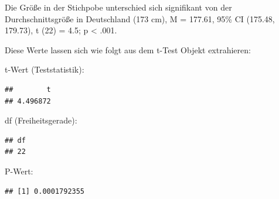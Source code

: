 \documentclass[
]{book}
\newenvironment{Shaded}{\begin{snugshade}}{\end{snugshade}}
\newcommand{\AttributeTok}[1]{\textcolor[rgb]{0.13,0.29,0.53}{#1}}
\newcommand{\DecValTok}[1]{\textcolor[rgb]{0.00,0.00,0.81}{#1}}
\newcommand{\FloatTok}[1]{\textcolor[rgb]{0.00,0.00,0.81}{#1}}
\newcommand{\FunctionTok}[1]{\textcolor[rgb]{0.13,0.29,0.53}{\textbf{#1}}}
\newcommand{\NormalTok}[1]{#1}
\newcommand{\SpecialCharTok}[1]{\textcolor[rgb]{0.81,0.36,0.00}{\textbf{#1}}}
\newcommand{\StringTok}[1]{\textcolor[rgb]{0.31,0.60,0.02}{#1}}
\begin{document}
Die Größe in der Stichpobe unterschied sich signifikant von der Durchschnittsgröße in Deutschland (173 cm), M = 177.61, 95\% CI (175.48, 179.73), t (22) = 4.5; p \textless{} .001.

Diese Werte lassen sich wie folgt aus dem t-Test Objekt extrahieren:

t-Wert (Teststatistik):

\begin{Shaded}
\end{Shaded}

\begin{verbatim}
##        t 
## 4.496872
\end{verbatim}

df (Freiheitsgerade):

\begin{Shaded}
\end{Shaded}

\begin{verbatim}
## df 
## 22
\end{verbatim}

P-Wert:

\begin{Shaded}
\end{Shaded}

\begin{verbatim}
## [1] 0.0001792355
\end{verbatim}
\end{document}
